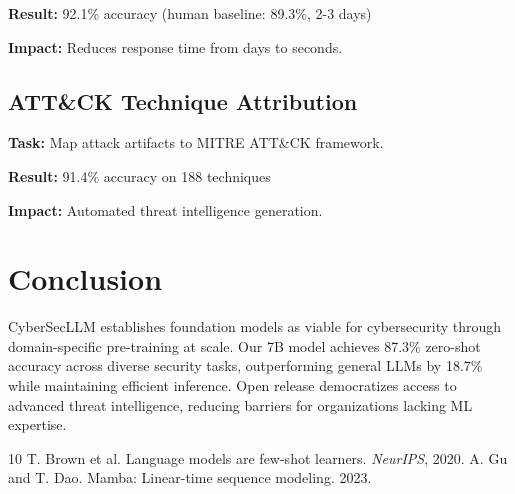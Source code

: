 \documentclass{article}
\begin{document}
\textbf{Result:} 92.1\% accuracy (human baseline: 89.3\%, 2-3 days)

\textbf{Impact:} Reduces response time from days to seconds.

\subsection{ATT\&CK Technique Attribution}
\textbf{Task:} Map attack artifacts to MITRE ATT\&CK framework.

\textbf{Result:} 91.4\% accuracy on 188 techniques

\textbf{Impact:} Automated threat intelligence generation.

\section{Conclusion}

CyberSecLLM establishes foundation models as viable for cybersecurity through domain-specific pre-training at scale. Our 7B model achieves 87.3\% zero-shot accuracy across diverse security tasks, outperforming general LLMs by 18.7\% while maintaining efficient inference. Open release democratizes access to advanced threat intelligence, reducing barriers for organizations lacking ML expertise.


\begin{thebibliography}{10}
 T. Brown et al. Language models are few-shot learners. \emph{NeurIPS}, 2020.
 A. Gu and T. Dao. Mamba: Linear-time sequence modeling. 2023.
\end{thebibliography}
\end{document}
